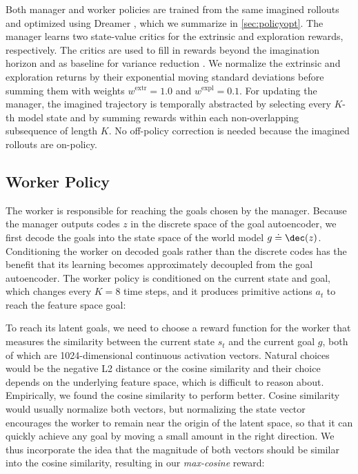 Both manager and worker policies are trained from the same imagined rollouts and optimized using Dreamer \citep{hafner2019dreamer,hafner2020dreamerv2}, which we summarize in \cref{sec:policyopt}.
The manager learns two state-value critics for the extrinsic and exploration rewards, respectively.
The critics are used to fill in rewards beyond the imagination horizon and as baseline for variance reduction \citep{williams1992reinforce}.
We normalize the extrinsic and exploration returns by their exponential moving standard deviations before summing them with weights $w^{\mathrm{extr}}=1.0$ and $w^{\mathrm{expl}}=0.1$.
For updating the manager, the imagined trajectory is temporally abstracted by selecting every $K$-th model state and by summing rewards within each non-overlapping subsequence of length $K$.
No off-policy correction \citep{schulman2017ppo,nachum2018hiro} is needed because the imagined rollouts are on-policy.

\subsection{Worker Policy}

The worker is responsible for reaching the goals chosen by the manager.
Because the manager outputs codes $z$ in the discrete space of the goal autoencoder, we first decode the goals into the state space of the world model $g \doteq \dec(z)$.
Conditioning the worker on decoded goals rather than the discrete codes has the benefit that its learning becomes approximately decoupled from the goal autoencoder.
The worker policy is conditioned on the current state and goal, which changes every $K=8$ time steps, and it produces primitive actions $a_t$ to reach the feature space goal:


To reach its latent goals, we need to choose a reward function for the worker that measures the similarity between the current state $s_t$ and the current goal $g$, both of which are 1024-dimensional continuous activation vectors.
Natural choices would be the negative L2 distance or the cosine similarity and their choice depends on the underlying feature space, which is difficult to reason about.
Empirically, we found the cosine similarity to perform better.
Cosine similarity would usually normalize both vectors, but normalizing the state vector encourages the worker to remain near the origin of the latent space, so that it can quickly achieve any goal by moving a small amount in the right direction.
We thus incorporate the idea that the magnitude of both vectors should be similar into the cosine similarity, resulting in our \emph{max-cosine} reward:

